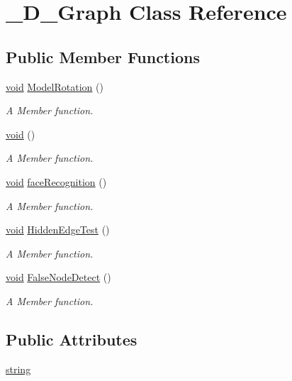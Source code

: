 \hypertarget{class__D__Graph}{}\section{\+\_\+\+D\+\_\+\+Graph Class Reference}
\label{class__D__Graph}
\subsection*{Public Member Functions}
\begin{DoxyCompactItemize}
\item 
\hyperlink{class__D__Graph_a0028473086438fcf74e68185f1a6a34d}{void} \hyperlink{class__D__Graph_a54ef6acb879e062ca692ab84aa9fa814}{Model\+Rotation} ()
\begin{DoxyCompactList}\small\item\em A Member function. \end{DoxyCompactList}\item 
\hyperlink{class__D__Graph_a0028473086438fcf74e68185f1a6a34d}{void} ()
\begin{DoxyCompactList}\small\item\em A Member function. \end{DoxyCompactList}\item 
\hyperlink{class__D__Graph_a0028473086438fcf74e68185f1a6a34d}{void} \hyperlink{class__D__Graph_ac789502514cb87f7740b9fae3ca0e2cd}{face\+Recognition} ()
\begin{DoxyCompactList}\small\item\em A Member function. \end{DoxyCompactList}\item 
\hyperlink{class__D__Graph_a0028473086438fcf74e68185f1a6a34d}{void} \hyperlink{class__D__Graph_a3808dda2c3ce3a6112b62ec8bf134201}{Hidden\+Edge\+Test} ()
\begin{DoxyCompactList}\small\item\em A Member function. \end{DoxyCompactList}\item 
\hyperlink{class__D__Graph_a0028473086438fcf74e68185f1a6a34d}{void} \hyperlink{class__D__Graph_ad6b0cc16836c2797aa0183247b674c65}{False\+Node\+Detect} ()
\begin{DoxyCompactList}\small\item\em A Member function. \end{DoxyCompactList}\end{DoxyCompactItemize}
\subsection*{Public Attributes}
\begin{DoxyCompactItemize}
\item 
\hyperlink{class__D__Graph_a626920fe8c191f9c6ac44737985811b4}{string}
\end{DoxyCompactItemize}


